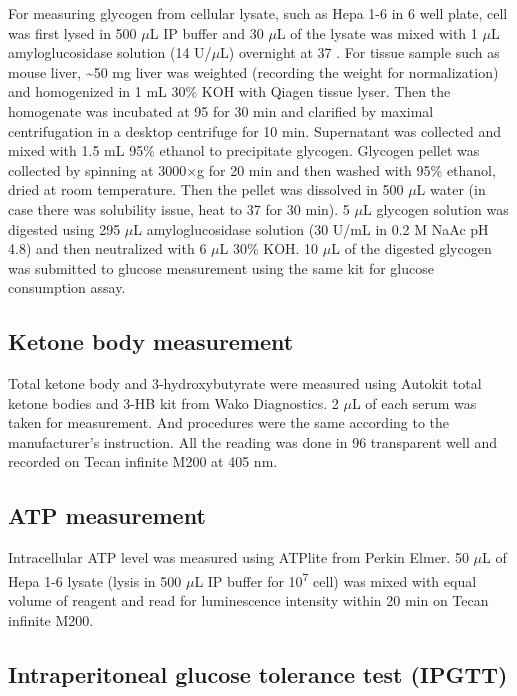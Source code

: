 For measuring glycogen from cellular lysate, such as Hepa 1-6 in 6 well plate, cell was first lysed in 500 $\mu$L IP buffer and 30 $\mu$L of the lysate was mixed with 1 $\mu$L amyloglucosidase solution (14 U/$\mu$L) overnight at 37 \celsius{}. For tissue sample such as mouse liver, \textasciitilde50 mg liver was weighted (recording the weight for normalization) and homogenized in 1 mL 30\% KOH with Qiagen tissue lyser. Then the homogenate was incubated at 95 \celsius{} for 30 min and clarified by maximal centrifugation in a desktop centrifuge for 10 min. Supernatant was collected and mixed with 1.5 mL 95\% ethanol to precipitate glycogen. Glycogen pellet was collected by spinning at 3000$\times$g for 20 min and then washed with 95\% ethanol, dried at room temperature. Then the pellet was dissolved in 500 $\mu$L water (in case there was solubility issue, heat to 37 \celsius{} for 30 min). 5 $\mu$L glycogen solution was digested using 295 $\mu$L amyloglucosidase solution (30 U/mL in 0.2 M NaAc pH 4.8) and then neutralized with 6 $\mu$L 30\% KOH. 10 $\mu$L of the digested glycogen was submitted to glucose measurement using the same kit for glucose consumption assay.


\subsection{Ketone body measurement}

Total ketone body and 3-hydroxybutyrate were measured using Autokit total ketone bodies and 3-HB kit from 
Wako Diagnostics. 2 $\mu$L of each serum was taken for measurement. And procedures were the same according to the manufacturer's instruction. All the reading was done in 96 transparent well and recorded on Tecan infinite M200 at 405 nm.


\subsection{ATP measurement}

Intracellular ATP level was measured using ATPlite\textsuperscript{\texttrademark} from Perkin Elmer. 50 $\mu$L of Hepa 1-6 lysate (lysis in 500 $\mu$L IP buffer for 10\textsuperscript{7} cell) was mixed with equal volume of reagent and read for luminescence intensity within 20 min on Tecan infinite M200.

\subsection{Intraperitoneal glucose tolerance test (IPGTT)}

